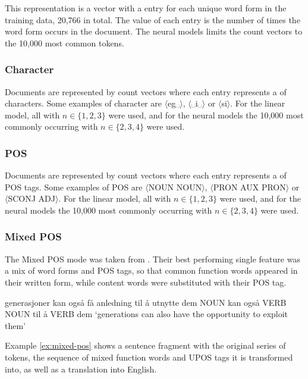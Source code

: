 This representation is a vector with a entry for each unique word form in the
training data, 20,766 in total. The value of each entry is the number of
times the word form occurs in the document. The neural models limits the
count vectors to the 10,000 most common tokens.

\subsubsection*{Character \ngrams}

Documents are represented by count vectors where each entry represents a
\ngram of characters. Some examples of character \ngrams are
$\langle$eg␣$\rangle$, $\langle$␣i␣$\rangle$ or $\langle$si$\rangle$. For the
linear model, all \ngrams with $n\in \{1,2,3\}$ were used, and for the neural
models the 10,000 most commonly occurring \ngrams with $n\in \{2,3,4\}$ were
used.

\subsubsection*{POS \ngrams}

Documents are represented by count vectors where each entry represents a
\ngram of POS tags. Some examples of POS \ngrams are $\langle$NOUN
NOUN$\rangle$, $\langle$PRON AUX PRON$\rangle$ or $\langle$SCONJ
ADJ$\rangle$. For the linear model, all \ngrams with $n\in \{1,2,3\}$ were
used, and for the neural models the 10,000 most commonly occurring \ngrams
with $n\in \{2,3,4\}$ were used.

\subsubsection*{Mixed POS}

The Mixed POS mode was taken from \textcite{malmasi15}. Their best performing
single feature was a mix of word forms and POS tags, so that common function
words appeared in their written form, while content words were substituted
with their POS tag.

\begin{example}
\gll generasjoner kan også få   anledning til å utnytte dem  
     NOUN         kan også VERB NOUN      til å VERB    dem  
\glt `generations can also have the opportunity to exploit them'
\glend
\label{ex:mixed-pos}
\end{example}

Example \ref{ex:mixed-pos} shows a sentence fragment with the original series
of tokens, the sequence of mixed function words and UPOS tags it is
transformed into, as well as a translation into English.

